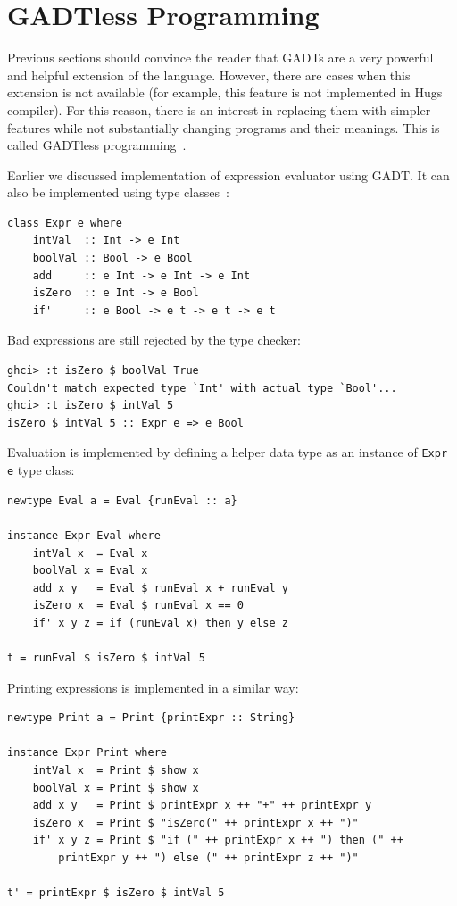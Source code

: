 \documentclass{tmr}
\begin{document}
\section{GADTless Programming}
\label{sec:gadtless}

Previous sections should convince the reader that GADTs are a very powerful and helpful extension of the language. However, there are cases when this extension is not available (for example, this feature is not implemented in Hugs compiler). For this reason, there is an interest in replacing them with simpler features while not substantially changing programs and their meanings. This is called GADTless programming~\cite{gadtless}.

Earlier we discussed implementation of expression evaluator using GADT. It can also be implemented using type classes~\cite{finally_tagless}:

\begin{Verbatim}
class Expr e where
    intVal  :: Int -> e Int
    boolVal :: Bool -> e Bool
    add     :: e Int -> e Int -> e Int
    isZero  :: e Int -> e Bool
    if'     :: e Bool -> e t -> e t -> e t
\end{Verbatim}

Bad expressions are still rejected by the type checker:

\begin{Verbatim}
ghci> :t isZero $ boolVal True
Couldn't match expected type `Int' with actual type `Bool'...
ghci> :t isZero $ intVal 5
isZero $ intVal 5 :: Expr e => e Bool
\end{Verbatim}

Evaluation is implemented by defining a helper data type as an instance of \verb|Expr e| type class:

\begin{Verbatim}
newtype Eval a = Eval {runEval :: a}

instance Expr Eval where
    intVal x  = Eval x
    boolVal x = Eval x
    add x y   = Eval $ runEval x + runEval y
    isZero x  = Eval $ runEval x == 0
    if' x y z = if (runEval x) then y else z 

t = runEval $ isZero $ intVal 5
\end{Verbatim}

Printing expressions is implemented in a similar way:

\begin{Verbatim}
newtype Print a = Print {printExpr :: String}

instance Expr Print where
    intVal x  = Print $ show x
    boolVal x = Print $ show x
    add x y   = Print $ printExpr x ++ "+" ++ printExpr y
    isZero x  = Print $ "isZero(" ++ printExpr x ++ ")"
    if' x y z = Print $ "if (" ++ printExpr x ++ ") then (" ++
        printExpr y ++ ") else (" ++ printExpr z ++ ")"

t' = printExpr $ isZero $ intVal 5
\end{Verbatim}
\end{document}
